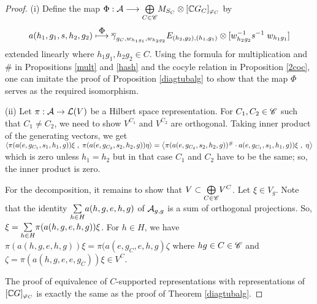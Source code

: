 \begin{proof}
(i) Define the map $ \Phi : \mathcal A \longrightarrow  \underset{C \in \mathscr C}{\bigoplus} M_{S_C} \otimes [\mathbb{C} G_C]_{\varphi_C}  $ by
\[
a(h_1,g_1,s,h_2,g_2) \overset{\displaystyle \Phi}{\longmapsto} \overline{\gamma}_{g_C , w_{h_1 g_1} , w_{h_2 g_2}} E_{(h_2,g_2) , (h_1,g_1)} \otimes [w^{-1}_{h_2 g_2} s^{-1} \; w_{h_1g_1} ]
\]
extended linearly where $ h_1g_1 , h_2 g_2 \in C $.
Using the formula for multiplication and $ \# $ in Propositions \ref{mult} and \ref{hash} and the cocyle relation in Proposition \ref{2coc}, one can imitate the proof of Proposition \ref{diagtubalg} to show that the map $ \Phi $ serves as the required isomorphism.

(ii) Let $\pi: \mathcal A \rightarrow \mathcal L (V) $ be a Hilbert space representation.
For $ C_1,C_2 \in \mathscr C $ such that $ C_1 \neq C_2 $, we need to show $ V^{C_1} $ and $ V^{C_2} $ are orthogonal.
Taking inner product of the generating vectors, we get $ \left\langle \pi (a(e,g_{C_1},s_1,h_1, g)) \xi\; ,\; \pi ( a(e,g_{C_2}, s_2,h_2,g)) \eta \right\rangle = \left\langle \pi (a(e,g_{C_2}, s_2,h_2,g)) ^\# \cdot a(e,g_{C_1},s_1,h_1, g)) \xi\; , \; \eta \right\rangle$ which is zero unless $ h_1 = h_2 $ but in that case $ C_1 $ and $ C_2 $ have to be the same; so, the inner product is zero.

For the decomposition, it remains to show that $ V \subset \underset{C\in \mathscr C}{\bigoplus} V^C $.
Let $ \xi \in V_g $.
Note that the identity $ \underset{h \in H}{\sum} a(h,g,e,h,g) $ of $ \mathcal A_{g,g} $ is a sum of orthogonal projections.
So, $ \xi = \underset{h \in H}{\sum} \pi (a(h,g,e,h,g)) \xi  $.
For $ h\in H $, we have $ \pi (a(h,g,e,h,g)) \xi = \pi (a(e,g_{C},e,h,g) \zeta$ where $hg \in C \in \mathscr C $ and $\zeta = \pi (a(h,g,e,e,g_C)) \xi \in V^C$.

The proof of equivalence of $ C $-supported representations with representations of $ [\mathbb{C} G]_{\varphi_C} $ is exactly the same as the proof of Theorem \ref{diagtubalg}.
\end{proof}

